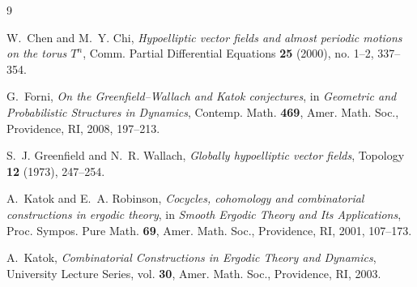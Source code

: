 \documentclass[11pt]{article}
\begin{document}
\begin{thebibliography}{9}

W.~Chen and M.~Y. Chi,
\newblock \emph{Hypoelliptic vector fields and almost periodic motions on the torus \(T^n\)},
\newblock Comm. Partial Differential Equations \textbf{25} (2000), no. 1--2, 337--354.

G.~Forni,
\newblock \emph{On the Greenfield--Wallach and Katok conjectures},
\newblock in \emph{Geometric and Probabilistic Structures in Dynamics},
Contemp. Math. \textbf{469}, Amer. Math. Soc., Providence, RI, 2008, 197--213.

S.~J. Greenfield and N.~R. Wallach,
\newblock \emph{Globally hypoelliptic vector fields},
\newblock Topology \textbf{12} (1973), 247--254.

A.~Katok and E.~A. Robinson,
\newblock \emph{Cocycles, cohomology and combinatorial constructions in ergodic theory},
\newblock in \emph{Smooth Ergodic Theory and Its Applications},
Proc. Sympos. Pure Math. \textbf{69}, Amer. Math. Soc., Providence, RI, 2001, 107--173.

A.~Katok,
\newblock \emph{Combinatorial Constructions in Ergodic Theory and Dynamics},
\newblock University Lecture Series, vol. \textbf{30}, Amer. Math. Soc., Providence, RI, 2003.

\end{thebibliography}
\end{document}
